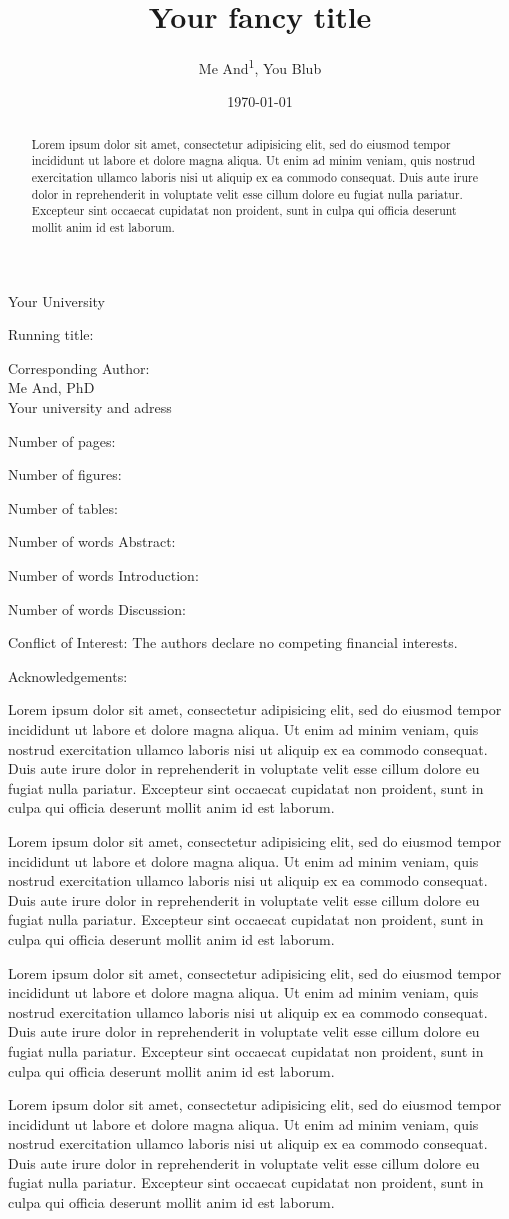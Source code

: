 \documentclass[10pt]{jneurosci}
\title{Your fancy title}
\date{\normalsize\today}
\author{Me And\textsuperscript{1}, You Blub}
\newcommand{\loremipsum}{Lorem ipsum dolor sit amet, consectetur adipisicing elit, sed do eiusmod tempor incididunt ut labore et dolore magna aliqua. Ut enim ad minim veniam, quis nostrud exercitation ullamco laboris nisi ut aliquip ex ea commodo consequat. Duis aute irure dolor in reprehenderit in voluptate velit esse cillum dolore eu fugiat nulla pariatur. Excepteur sint occaecat cupidatat non proident, sunt in culpa qui officia deserunt mollit anim id est laborum.}
\begin{document}
\maketitle
\begin{affiliations}
\item Your University
\end{affiliations}

\begin{frontpage}

  \item[Running title:] 
  \item[Corresponding Author:] ~\\
Me And, PhD\\
Your university and adress\\
\item[Number of pages:]
\item[Number of figures:]
\item[Number of tables:]
\item[Number of words Abstract:]
\item[Number of words Introduction:]
\item[Number of words Discussion:]
\item[Conflict of Interest:] The authors declare no competing financial interests.
\item[Acknowledgements:] 
\end{frontpage}

\begin{abstract}
\loremipsum
\end{abstract}


\begin{introduction}
\loremipsum
\nocite{*}
\end{introduction}

\begin{methods}
\loremipsum
\end{methods}

\begin{results}
\loremipsum
\end{results}


\begin{discussion}
\loremipsum
\end{discussion}

\end{document}
